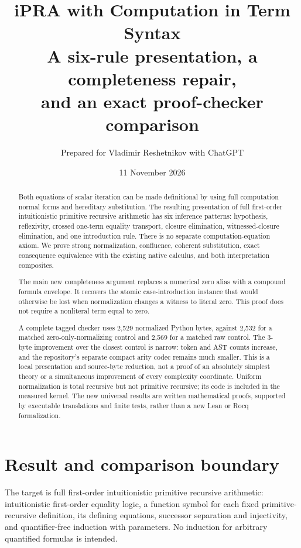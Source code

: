 \documentclass[11pt,letterpaper]{article}
\title{\color{ink}\bfseries iPRA with Computation in Term Syntax\\[6pt]
\large A six-rule presentation, a completeness repair,\\
and an exact proof-checker comparison}
\author{Prepared for Vladimir Reshetnikov with ChatGPT}
\date{11 November 2026}
\theoremstyle{definition}
\theoremstyle{remark}
\begin{document}
\maketitle
\begin{abstract}
Both equations of scalar iteration can be made definitional by using full
computation normal forms and hereditary substitution. The resulting presentation
of full first-order intuitionistic primitive recursive arithmetic has six
inference patterns: hypothesis, reflexivity, crossed one-term equality transport,
closure elimination, witnessed-closure elimination, and one introduction rule.
There is no separate computation-equation axiom. We prove strong normalization,
confluence, coherent substitution, exact consequence equivalence with the
existing native calculus, and both interpretation composites.

The main new completeness argument replaces a numerical zero alias with a
compound formula envelope. It recovers the atomic case-introduction instance
that would otherwise be lost when normalization changes a witness to literal
zero. This proof does not require a nonliteral term equal to zero.

A complete tagged checker uses 2,529 normalized Python bytes, against 2,532
for a matched zero-only-normalizing control and 2,569 for a matched raw control.
The 3-byte improvement over the closest control is narrow: token and AST counts
increase, and the repository's separate compact arity codec remains much smaller.
This is a local presentation and source-byte reduction, not a proof of an
absolutely simplest theory or a simultaneous improvement of every complexity
coordinate. Uniform normalization is total recursive but not primitive
recursive; its code is included in the measured kernel. The new universal
results are written mathematical proofs, supported by executable translations
and finite tests, rather than a new Lean or Rocq formalization.
\end{abstract}
\clearpage
\setcounter{tocdepth}{2}
\tableofcontents
\clearpage

\section{Result and comparison boundary}
\label{sec:result}

The target is full first-order intuitionistic primitive recursive arithmetic:
intuitionistic first-order equality logic, a function symbol for each fixed
primitive-recursive definition, its defining equations, successor separation
and injectivity, and quantifier-free induction with parameters. No induction
for arbitrary quantified formulas is intended.
\end{document}
